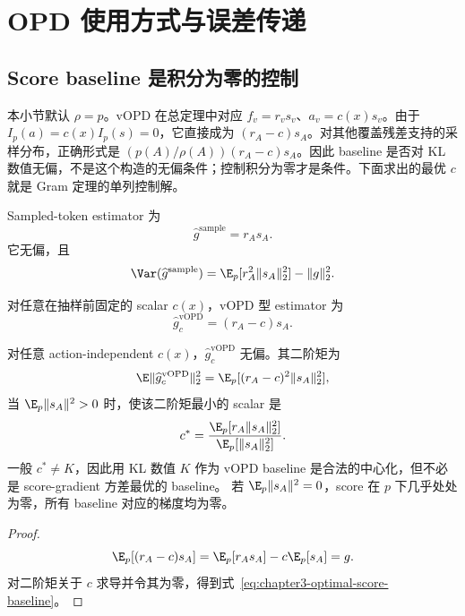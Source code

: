 \section{OPD 使用方式与误差传递}
\label{sec:kl-opd-roles}
\subsection{Score baseline 是积分为零的控制}

本小节默认 $\rho=p$。vOPD 在总定理中对应 $f_v=r_vs_v$、$a_v=c(x)s_v$。由于 $I_p(a)=c(x)I_p(s)=0$，它直接成为 $(r_A-c)s_A$。对其他覆盖残差支持的采样分布，正确形式是 $(p(A)/\rho(A))(r_A-c)s_A$。因此 baseline 是否对 KL 数值无偏，不是这个构造的无偏条件；控制积分为零才是条件。下面求出的最优 $c$ 就是 Gram 定理的单列控制解。


Sampled-token estimator 为
\[
 \widehat g^{\mathrm{sample}}=r_As_A.
\]
它无偏，且
\begin{equation}
 \Var(\widehat g^{\mathrm{sample}})
 =\E_p[r_A^2\lVert s_A\rVert_2^2]-\lVert g\rVert_2^2.
 \label{eq:chapter3-sample-grad-var}
\end{equation}

对任意在抽样前固定的 scalar $c(x)$，vOPD 型 estimator 为
\begin{equation}
 \widehat g^{\mathrm{vOPD}}_c=(r_A-c)s_A.
 \label{eq:chapter3-vopd}
\end{equation}

\begin{proposition}
\label{prop:chapter3-vopd}
对任意 action-independent $c(x)$，$\widehat g^{\mathrm{vOPD}}_c$ 无偏。其二阶矩为
\[
 \E\lVert\widehat g^{\mathrm{vOPD}}_c\rVert_2^2
 =\E_p[(r_A-c)^2\lVert s_A\rVert_2^2],
\]
当 $\E_p\lVert s_A\rVert^2>0$ 时，使该二阶矩最小的 scalar 是
\begin{equation}
 c^*=\frac{\E_p[r_A\lVert s_A\rVert_2^2]}{\E_p[\lVert s_A\rVert_2^2]}.
 \label{eq:chapter3-optimal-score-baseline}
\end{equation}
一般 $c^*\neq K$，因此用 KL 数值 $K$ 作为 vOPD baseline 是合法的中心化，但不必是 score-gradient 方差最优的 baseline。
若 $\E_p\lVert s_A\rVert^2=0$，score 在 $p$ 下几乎处处为零，所有 baseline 对应的梯度均为零。
\end{proposition}

\begin{proof}
\[
 \E_p[(r_A-c)s_A]=\E_p[r_As_A]-c\E_p[s_A]=g.
\]
对二阶矩关于 $c$ 求导并令其为零，得到式~\eqref{eq:chapter3-optimal-score-baseline}。
\end{proof}

